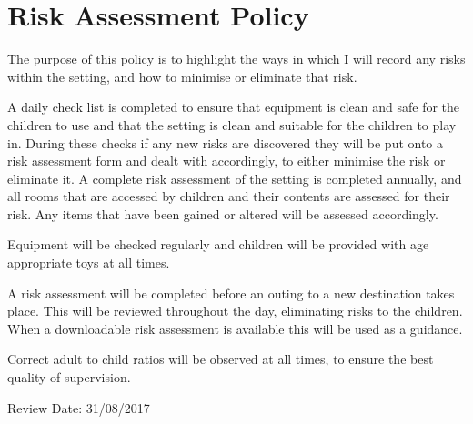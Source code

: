 

\section{Risk Assessment Policy}

The purpose of this policy is to highlight the ways in which I will
record any risks within the setting, and how to minimise or eliminate
that risk.

A daily check list is completed to ensure that equipment is clean and
safe for the children to use and that the setting is clean and suitable
for the children to play in. During these checks if any new risks are
discovered they will be put onto a risk assessment form and dealt with
accordingly, to either minimise the risk or eliminate it. A complete
risk assessment of the setting is completed annually, and all rooms that
are accessed by children and their contents are assessed for their risk.
Any items that have been gained or altered will be assessed accordingly.

Equipment will be checked regularly and children will be provided with
age appropriate toys at all times.

A risk assessment will be completed before an outing to a new
destination takes place. This will be reviewed throughout the day,
eliminating risks to the children. When a downloadable risk assessment
is available this will be used as a guidance.

Correct adult to child ratios will be observed at all times, to ensure
the best quality of supervision.

Review Date: 31/08/2017


